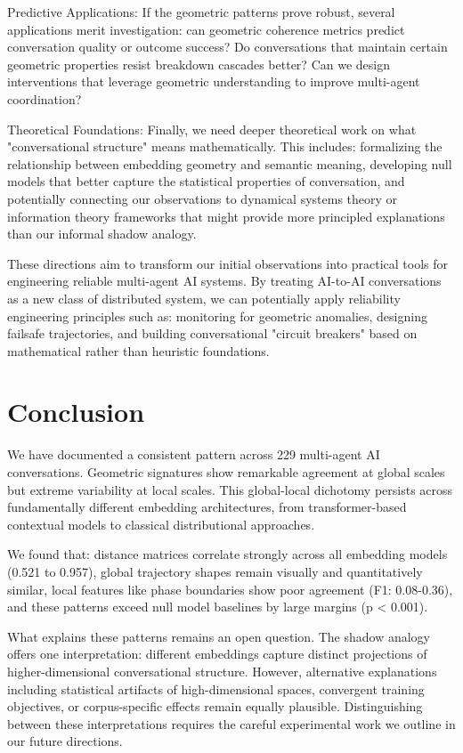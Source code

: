\documentclass[11pt,letterpaper]{article}
\newcommand{\totalConversations}{229}
\newcommand{\minPairwiseCorr}{0.521}
\newcommand{\maxPairwiseCorr}{0.957}
\begin{document}
Predictive Applications: If the geometric patterns prove robust, several applications merit investigation: can geometric coherence metrics predict conversation quality or outcome success? Do conversations that maintain certain geometric properties resist breakdown cascades better? Can we design interventions that leverage geometric understanding to improve multi-agent coordination?

Theoretical Foundations: Finally, we need deeper theoretical work on what "conversational structure" means mathematically. This includes: formalizing the relationship between embedding geometry and semantic meaning, developing null models that better capture the statistical properties of conversation, and potentially connecting our observations to dynamical systems theory or information theory frameworks that might provide more principled explanations than our informal shadow analogy.

These directions aim to transform our initial observations into practical tools for engineering reliable multi-agent AI systems. By treating AI-to-AI conversations as a new class of distributed system, we can potentially apply reliability engineering principles such as: monitoring for geometric anomalies, designing failsafe trajectories, and building conversational "circuit breakers" based on mathematical rather than heuristic foundations.

\section{Conclusion}

We have documented a consistent pattern across \totalConversations{} multi-agent AI conversations. Geometric signatures show remarkable agreement at global scales but extreme variability at local scales. This global-local dichotomy persists across fundamentally different embedding architectures, from transformer-based contextual models to classical distributional approaches.

We found that: distance matrices correlate strongly across all embedding models (\minPairwiseCorr{} to \maxPairwiseCorr{}), global trajectory shapes remain visually and quantitatively similar, local features like phase boundaries show poor agreement (F1: 0.08-0.36), and these patterns exceed null model baselines by large margins (p < 0.001).

What explains these patterns remains an open question. The shadow analogy offers one interpretation: different embeddings capture distinct projections of higher-dimensional conversational structure. However, alternative explanations including statistical artifacts of high-dimensional spaces, convergent training objectives, or corpus-specific effects remain equally plausible. Distinguishing between these interpretations requires the careful experimental work we outline in our future directions.
\end{document}
